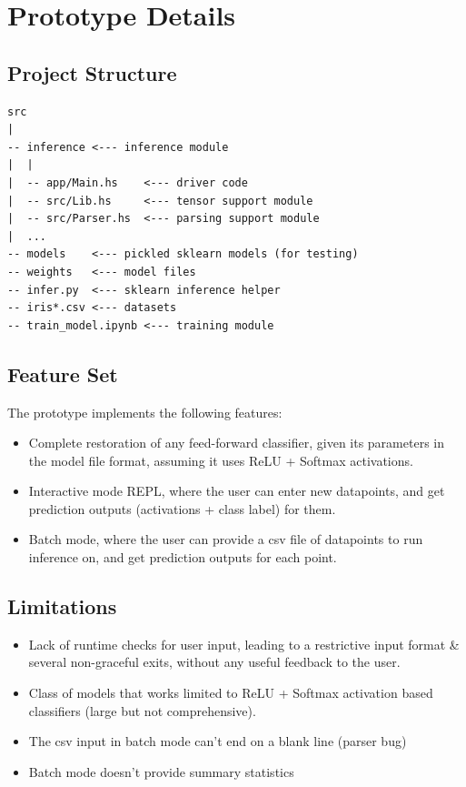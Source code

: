 \documentclass[12pt]{article}
\begin{document}
\section{Prototype Details}
\subsection{Project Structure}
\begin{verbatim}
src
|
-- inference <--- inference module
|  |
|  -- app/Main.hs    <--- driver code
|  -- src/Lib.hs     <--- tensor support module
|  -- src/Parser.hs  <--- parsing support module
|  ...
-- models    <--- pickled sklearn models (for testing)
-- weights   <--- model files
-- infer.py  <--- sklearn inference helper
-- iris*.csv <--- datasets
-- train_model.ipynb <--- training module
\end{verbatim}

\subsection{Feature Set}
The prototype implements the following features:
\begin{itemize}
	\item Complete restoration of any feed-forward classifier, given its parameters in the model file format, assuming it uses ReLU + Softmax activations.
	\item Interactive mode REPL, where the user can enter new datapoints, and get prediction outputs (activations + class label) for them.
	\item Batch mode, where the user can provide a csv file of datapoints to run inference on, and get prediction outputs for each point.
\end{itemize}

\subsection{Limitations}
\begin{itemize}
	\item Lack of runtime checks for user input, leading to a restrictive input format \& several non-graceful exits, without any useful feedback to the user.
	\item Class of models that works limited to ReLU + Softmax activation based classifiers (large but not comprehensive).
	\item The csv input in batch mode can't end on a blank line (parser bug)
	\item Batch mode doesn't provide summary statistics
\end{itemize}
\end{document}
